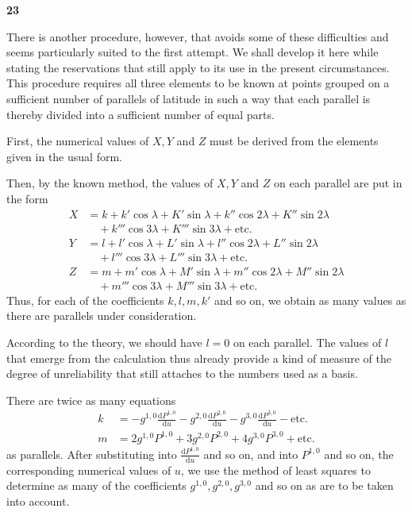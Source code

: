 {\renewcommand{\Article}[1]{\par\medskip\Needspace{4\baselineskip}\pdfbookmark[1]{Art. #1}{erdmagnetismus-art-#1}\centerline{\textbf{#1}}\nobreak\smallskip}\Article{23}}
There is another procedure, however, that avoids some of these difficulties and seems particularly suited to the first attempt. We shall develop it here while stating the reservations that still apply to its use in the present circumstances. This procedure requires all three elements to be known at points grouped on a sufficient number of parallels of latitude in such a way that each parallel is thereby divided into a sufficient number of equal parts.

First, the numerical values of $X,Y$ and $Z$ must be derived from the elements given in the usual form.

Then, by the known method, the values of $X,Y$ and $Z$ on each parallel are put in the form
\[
\begin{aligned}
X&=k+k'\cos\lambda+K'\sin\lambda+k''\cos2\lambda+K''\sin2\lambda\\&\quad+k'''\cos3\lambda+K'''\sin3\lambda+\text{etc.}\\
Y&=l+l'\cos\lambda+L'\sin\lambda+l''\cos2\lambda+L''\sin2\lambda\\&\quad+l'''\cos3\lambda+L'''\sin3\lambda+\text{etc.}\\
Z&=m+m'\cos\lambda+M'\sin\lambda+m''\cos2\lambda+M''\sin2\lambda\\&\quad+m'''\cos3\lambda+M'''\sin3\lambda+\text{etc.}
\end{aligned}
\]
Thus, for each of the coefficients $k,l,m,k'$ and so on, we obtain as many values as there are parallels under consideration.

According to the theory, we should have $l=0$ on each parallel. The values of $l$ that emerge from the calculation thus already provide a kind of measure of the degree of unreliability that still attaches to the numbers used as a basis.

There are twice as many equations
\[
\begin{aligned}
k&=-g^{1,0}\frac{\mathrm{d}P^{1,0}}{\mathrm{d}u}-g^{2,0}\frac{\mathrm{d}P^{2,0}}{\mathrm{d}u}-g^{3,0}\frac{\mathrm{d}P^{3,0}}{\mathrm{d}u}-\text{etc.}\\
m&=2g^{1,0}P^{1,0}+3g^{2,0}P^{2,0}+4g^{3,0}P^{3,0}+\text{etc.}
\end{aligned}
\]
as parallels. After substituting into $\frac{\mathrm{d}P^{1,0}}{\mathrm{d}u}$ and so on, and into $P^{1,0}$ and so on, the corresponding numerical values of $u$, we use the method of least squares to determine as many of the coefficients $g^{1,0},g^{2,0},g^{3,0}$ and so on as are to be taken into account.

